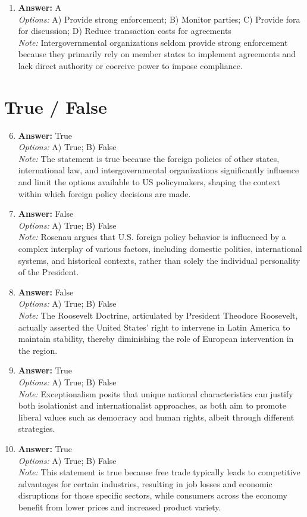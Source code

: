 \documentclass[12pt]{article}
\begin{document}
\begin{enumerate}[label=\arabic*.]
\item \textbf{Answer:} A
\\ \textit{Options:} A) Provide strong enforcement; B) Monitor parties; C) Provide fora for discussion; D) Reduce transaction costs for agreements
\\ \textit{Note:} Intergovernmental organizations seldom provide strong enforcement because they primarily rely on member states to implement agreements and lack direct authority or coercive power to impose compliance.
\end{enumerate}

\section*{True / False}
\begin{enumerate}[label=\arabic*.]
\setcounter{enumi}{5}
\item \textbf{Answer:} True
\\ \textit{Options:} A) True; B) False
\\ \textit{Note:} The statement is true because the foreign policies of other states, international law, and intergovernmental organizations significantly influence and limit the options available to US policymakers, shaping the context within which foreign policy decisions are made.
\item \textbf{Answer:} False
\\ \textit{Options:} A) True; B) False
\\ \textit{Note:} Rosenau argues that U.S. foreign policy behavior is influenced by a complex interplay of various factors, including domestic politics, international systems, and historical contexts, rather than solely the individual personality of the President.
\item \textbf{Answer:} False
\\ \textit{Options:} A) True; B) False
\\ \textit{Note:} The Roosevelt Doctrine, articulated by President Theodore Roosevelt, actually asserted the United States' right to intervene in Latin America to maintain stability, thereby diminishing the role of European intervention in the region.
\item \textbf{Answer:} True
\\ \textit{Options:} A) True; B) False
\\ \textit{Note:} Exceptionalism posits that unique national characteristics can justify both isolationist and internationalist approaches, as both aim to promote liberal values such as democracy and human rights, albeit through different strategies.
\item \textbf{Answer:} True
\\ \textit{Options:} A) True; B) False
\\ \textit{Note:} This statement is true because free trade typically leads to competitive advantages for certain industries, resulting in job losses and economic disruptions for those specific sectors, while consumers across the economy benefit from lower prices and increased product variety.
\end{enumerate}
\end{document}

